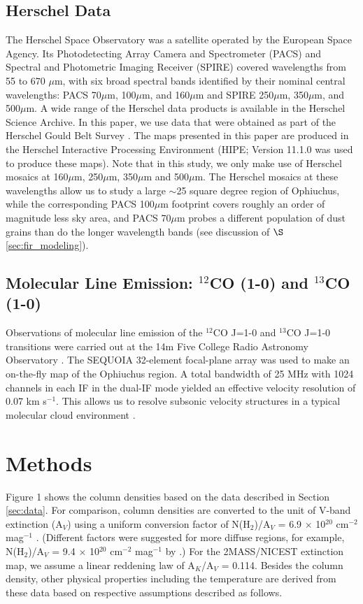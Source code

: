 \documentclass[11pt,a4paper]{emulateapj}
\begin{document}
\subsection{Herschel Data}
\label{sec:herschel_data}
The Herschel Space Observatory was a satellite operated by the European Space Agency. Its Photodetecting Array Camera and Spectrometer (PACS) and Spectral and Photometric Imaging Receiver (SPIRE) covered wavelengths from 55 to 670 $\mu$m, with six broad spectral bands identified by their nominal central wavelengths: PACS 70$\mu$m, 100$\mu$m, and 160$\mu$m and SPIRE 250$\mu$m, 350$\mu$m, and 500$\mu$m. A wide range of the Herschel data products is available in the Herschel Science Archive. In this paper, we use data that were obtained as part of the Herschel Gould Belt Survey \citep{Andre_2010}. The maps presented in this paper are produced in the Herschel Interactive Processing Environment (HIPE; Version 11.1.0 was used to produce these maps). Note that in this study, we only make use of Herschel mosaics at 160$\mu$m, 250$\mu$m, 350$\mu$m and 500$\mu$m. The Herschel mosaics at these wavelengths allow us to study a large $\sim$25 square degree region of Ophiuchus, while the  corresponding PACS 100$\mu$m footprint covers roughly an order of magnitude less sky area, and PACS 70$\mu$m probes a different population of dust grains than do the longer wavelength bands (see discussion of $\S$\ref{sec:fir_modeling}).

\subsection{Molecular Line Emission: $^{12}$CO (1-0) and $^{13}$CO (1-0)}
Observations of molecular line emission of the $^{12}$CO J=1-0 and $^{13}$CO J=1-0 transitions were carried out at the 14m Five College Radio Astronomy Observatory \citep[FCRAO;]{Ridge_2006}. The SEQUOIA 32-element focal-plane array was used to make an on-the-fly map of the Ophiuchus region. A total bandwidth of 25 MHz with 1024 channels in each IF in the dual-IF mode yielded an effective velocity resolution of 0.07 km s$^{-1}$. This allows us to resolve subsonic velocity structures in a typical molecular cloud environment \citep[with a temperature of 15 K and an average molecular weight of 2.33 m$_H$;]{Carey_1998,Pillai_2006}.

\section{Methods}
\label{sec:methods}
Figure 1 shows the column densities based on the data described in Section \ref{sec:data}. For comparison, column densities are converted to the unit of V-band extinction (A$_V$) using a uniform conversion factor of N(H$_2$)/A$_V$ = 6.9 $\times$ 10$^{20}$ cm$^{-2}$ mag$^{-1}$ \citep{Draine_2003,Evans_2009}. (Different factors were suggested for more diffuse regions, for example, N(H$_2$)/A$_V$ = 9.4 $\times$ 10$^{20}$ cm$^{-2}$ mag$^{-1}$ by \citet{Bohlin_1978}.) For the 2MASS/NICEST extinction map, we assume a linear reddening law of A$_K$/A$_V$ = 0.114. Besides the column density, other physical properties including the temperature are derived from these data based on respective assumptions described as follows.
\end{document}

